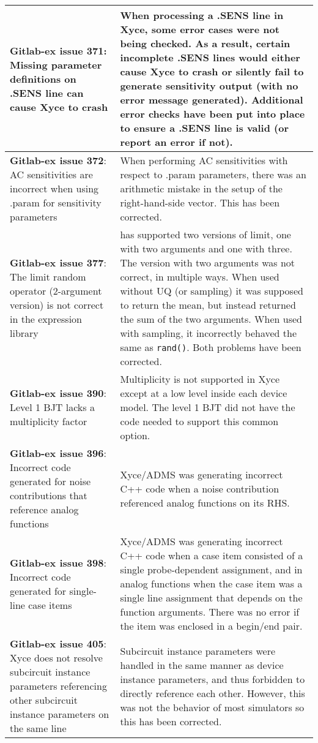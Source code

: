 {\begin{longtable}[h] {>{\raggedright\small}m{2in}|>{\raggedright\let\\\tabularnewline\small}m{3.5in}}
\textbf{Gitlab-ex issue 371}: Missing parameter definitions on .SENS line can cause Xyce to crash &
When processing a .SENS line in Xyce, some error cases were not being
checked. As a result, certain incomplete .SENS lines would either cause
Xyce to crash or silently fail to generate sensitivity output (with no
error message generated). Additional error checks have been put into
place to ensure a .SENS line is valid (or report an error if not).  \\ \hline

\textbf{Gitlab-ex issue 372}:  AC sensitivities are incorrect when using .param for sensitivity parameters &
When performing AC sensitivities with respect to .param parameters,
there was an arithmetic mistake in the setup of the right-hand-side
vector.  This has been corrected.  \\ \hline

\textbf{Gitlab-ex issue 377}:  The limit random operator (2-argument version) is not correct in the expression library &
\Xyce{} has supported two versions of limit, one with two arguments and one
with three.  The version with two arguments was not correct, in
multiple ways.  When used without UQ (or sampling) it was supposed to
return the mean, but instead returned the sum of the two arguments.
When used with sampling, it incorrectly behaved the same
as \texttt{rand()}.  Both problems have been corrected.  \\ \hline

\textbf{Gitlab-ex issue 390}:  Level 1 BJT lacks a multiplicity factor &
Multiplicity is not supported in Xyce except at a low level inside
each device model.  The level 1 BJT did not have the code needed to
support this common option. \\ \hline

\textbf{Gitlab-ex issue 396}: Incorrect code generated for noise contributions that reference analog functions &
Xyce/ADMS was generating incorrect C++ code when a noise contribution
referenced analog functions on its RHS.  \\ \hline

\textbf{Gitlab-ex issue 398}: Incorrect code generated for single-line case items &
Xyce/ADMS was generating incorrect C++ code when a case item consisted
of a single probe-dependent assignment, and in analog functions when
the case item was a single line assignment that depends on the
function arguments.  There was no error if the item was enclosed in a
begin/end pair.  \\ \hline

\textbf{Gitlab-ex issue 405}: 
Xyce does not resolve subcircuit instance parameters referencing other subcircuit 
instance parameters on the same line &
Subcircuit instance parameters were handled in the same manner as device instance 
parameters, and thus forbidden to directly reference each other.  However, this was 
not the behavior of most simulators so this has been corrected.
\\ \hline

\end{longtable}
}
